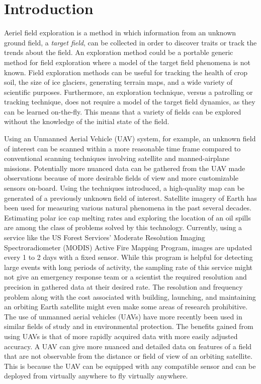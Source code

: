 
\chapter{Introduction}
Aeriel field exploration is a method in which information from an unknown ground field, a \textit{target field}, can be collected in order to discover traits or track the trends about the field. An exploration method could be a portable generic method for field exploration where a model of the target field phenomena is not known. Field exploration methods can be useful for tracking the health of crop soil, the size of ice glaciers, generating terrain maps, and a wide variety of scientific purposes. Furthermore, an exploration technique, versus a patrolling or tracking technique, does not require a model of the target field dynamics, as they can be learned on-the-fly. This means that a variety of fields can be explored without the knowledge of the initial state of the field.

Using an Unmanned Aerial Vehicle (UAV) system, for example, an unknown field of interest can be scanned within a more reasonable time frame compared to conventional scanning techniques involving satellite and manned-airplane missions. Potentially more nuanced data can be gathered from the UAV made observations because of more desirable fields of view and more customizable sensors on-board. Using the techniques introduced, a high-quality map can be generated of a previously unknown field of interest. Satellite imagery of Earth has been used for measuring various natural phenomena in the past several decades. Estimating polar ice cap melting rates and exploring the location of an oil spills are among the class of problems solved by this technology. Currently, using a service like the US Forest Services' Moderate Resolution Imaging Spectroradiometer (MODIS) Active Fire Mapping Program, images are updated every 1 to 2 days with a fixed sensor. While this program is helpful for detecting large events with long periods of activity, the sampling rate of this service might not give an emergency response team or a scientist the required resolution and precision in gathered data at their desired rate. The resolution and frequency problem along with the cost associated with building, launching, and maintaining an orbiting Earth satellite might even make some areas of research prohibitive. The use of unmanned aerial vehicles (UAVs) have more recently been used in similar fields of study and in environmental protection. The benefits gained from using UAVs is that of more rapidly acquired data with more easily adjusted accuracy. A UAV can give more nuanced and detailed data on features of a field that are not observable from the distance or field of view of an orbiting satellite. This is because the UAV can be equipped with any compatible sensor and can be deployed from virtually anywhere to fly virtually anywhere.

